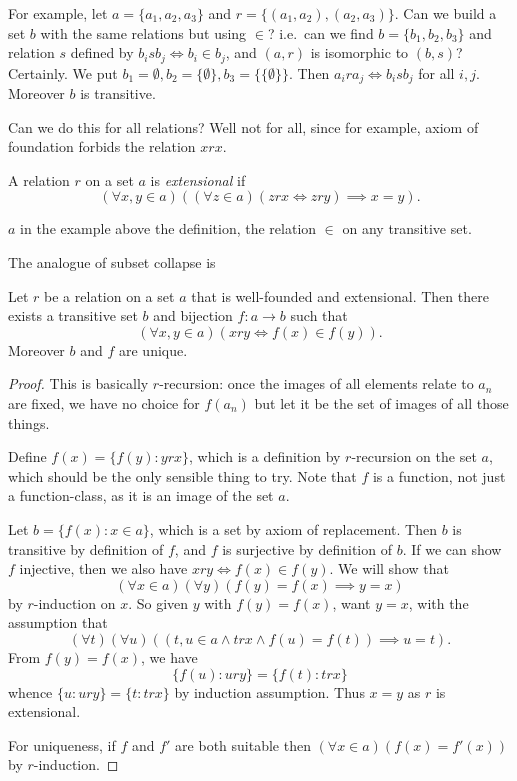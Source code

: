 \documentclass[a4paper]{article}
\begin{document}
For example, let \(a = \{a_1, a_2, a_3\}\) and \(r = \{(a_1, a_2), (a_2, a_3)\}\). Can we build a set \(b\) with the same relations but using \(\in\)? i.e.\ can we find \(b = \{b_1, b_2, b_3\}\) and relation \(s\) defined by \(b_i s b_j \iff b_i \in b_j\), and \((a, r)\) is isomorphic to \((b, s)\)? Certainly. We put \(b_1 = \emptyset, b_2 = \{\emptyset\}, b_3 = \{\{\emptyset\}\}\). Then \(a_i r a_j \iff b_i s b_j\) for all \(i, j\). Moreover \(b\) is transitive.

Can we do this for all relations? Well not for all, since for example, axiom of foundation forbids the relation \(x r x\).

\begin{definition}[Extensionality]
  A relation \(r\) on a set \(a\) is \emph{extensional} if
  \[
    (\forall x, y \in a) ((\forall z \in a) (z r x \iff z r y) \implies x = y).
  \]
\end{definition}

\begin{eg}
  \(a\) in the example above the definition, the relation \(\in\) on any transitive set.
\end{eg}

The analogue of subset collapse is

\begin{theorem}
  \label{thm:Mostowski}
  Let \(r\) be a relation on a set \(a\) that is well-founded and extensional. Then there exists a transitive set \(b\) and bijection \(f: a \to b\) such that
  \[
    (\forall x, y \in a) (x r y \iff f(x) \in f(y)).
  \]
  Moreover \(b\) and \(f\) are unique.
\end{theorem}

\begin{proof}
  This is basically \(r\)-recursion: once the images of all elements relate to \(a_n\) are fixed, we have no choice for \(f(a_n)\) but let it be the set of images of all those things.

  Define \(f(x) = \{f(y): y r x\}\), which is a definition by \(r\)-recursion on the set \(a\), which should be the only sensible thing to try. Note that \(f\) is a function, not just a function-class, as it is an image of the set \(a\).

  Let \(b = \{f(x): x \in a\}\), which is a set by axiom of replacement. Then \(b\) is transitive by definition of \(f\), and \(f\) is surjective by definition of \(b\). If we can show \(f\) injective, then we also have \(x r y \iff f(x) \in f(y)\). We will show that
  \[
    (\forall x \in a) (\forall y) (f(y) = f(x) \implies y = x)
  \]
  by \(r\)-induction on \(x\). So given \(y\) with \(f(y) = f(x)\), want \(y = x\), with the assumption that
  \[
    (\forall t) (\forall u) ((t, u \in a \land t r x \land f(u) = f(t)) \implies u = t).
  \]
  From \(f(y) = f(x)\), we have
  \[
    \{f(u): u r y\} = \{f(t): t r x\}
  \]
  whence \(\{u: u r y\} = \{t: t r x\}\) by induction assumption. Thus \(x = y\) as \(r\) is extensional.

  For uniqueness, if \(f\) and \(f'\) are both suitable then \((\forall x \in a) (f(x) = f'(x))\) by \(r\)-induction.
\end{proof}
\end{document}
